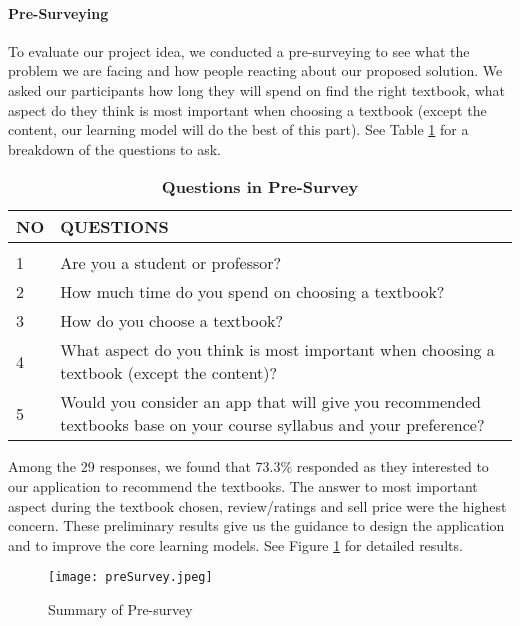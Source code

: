 \paragraph{Pre-Surveying}
To evaluate our project idea, we conducted a pre-surveying to see what the problem we are facing and how people reacting about our proposed solution. We asked our participants how long they will spend on find the right textbook, what aspect do they think is most important when choosing a textbook (except the content, our learning model will do the best of this part). See Table \ref{Pre-survey} for a breakdown of the questions to ask.
\begin{table}[!htbp]
\caption{\bf Questions in Pre-Survey} 
\label{Pre-survey}
\begin{center}
\begin{tabular}{  l  p{6cm} }
\bf NO & \bf QUESTIONS\\ \hline \\
1 & Are you a student or professor?\\
2 & How much time do you spend on choosing a textbook?\\
3 & How do you choose a textbook?\\
4 & What aspect do you think is most important when choosing a textbook (except the content)? \\
5 & Would you consider an app that will give you recommended textbooks base on your course syllabus and your preference? \\
\end{tabular} 
\end{center}
\end{table}
Among the 29 responses, we found that 73.3\% responded as they interested to our application to recommend the textbooks. The answer to most important aspect during the textbook chosen, review/ratings and sell price were the highest concern. These preliminary results give us the guidance to design the application and to improve the core learning models. See Figure \ref{result_of_presurvey} for detailed results.

\begin{figure}[ht]
\caption{Summary of Pre-survey}
\label{result_of_presurvey}
\centering
\texttt{[image: preSurvey.jpeg]}
\end{figure}

